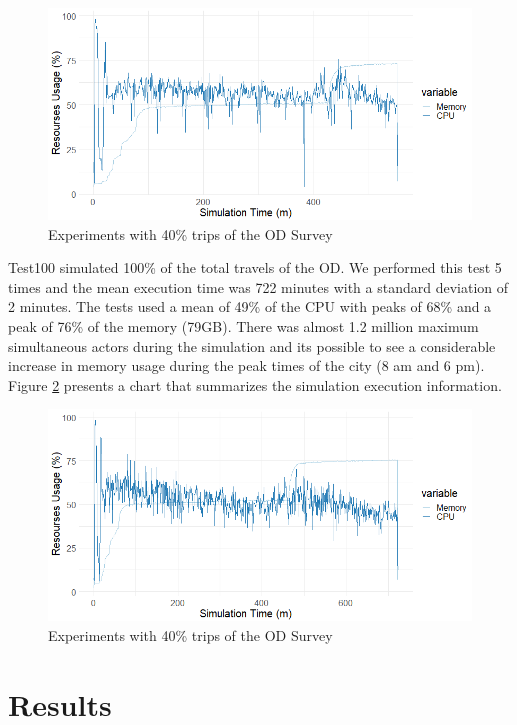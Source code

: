 \begin{figure}[!htb]
\centering
\includegraphics[width=1\textwidth]{figuras/chap-exp/experiments80.png}
\caption{Experiments with 40\% trips of the OD Survey}
\label{fig:exp80}
\end{figure}

Test100 simulated 100\% of the total travels of the OD. We performed this test 5 times and the mean execution time was 722 minutes with a standard deviation of 2 minutes. The tests used a mean of 49\% of the CPU with peaks of 68\% and a peak of 76\% of the memory (79GB). There was almost 1.2 million maximum simultaneous actors during the simulation and its possible to see a considerable increase in memory usage during the peak times of the city (8 am and 6 pm). Figure \ref{fig:exp100} presents a chart that summarizes the simulation execution information. 

\begin{figure}[!htb]
\centering
\includegraphics[width=1\textwidth]{figuras/chap-exp/experiments100.png}
\caption{Experiments with 40\% trips of the OD Survey}
\label{fig:exp100}
\end{figure}

\section{Results}
\label{sec:results_exp}

